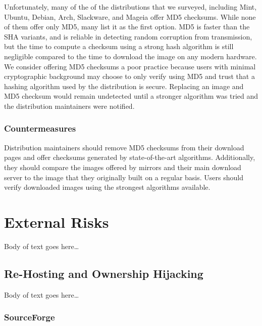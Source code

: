 \documentclass[conference]{IEEEtran}
\begin{document}
\indent Unfortunately, many of the of the distributions that we surveyed, including Mint, Ubuntu, Debian, Arch, Slackware, and Mageia offer MD5 checksums. While none of them offer only MD5, many list it as the first option. MD5 is faster than the SHA variants, and is reliable in detecting random corruption from transmission, but the time to compute a checksum using a strong hash algorithm is still negligible compared to the time to download the image on any modern hardware. We consider offering MD5 checksums a poor practice because users with minimal cryptographic background may choose to only verify using MD5 and trust that a hashing algorithm used by the distribution is secure. Replacing an image and MD5 checksum would remain undetected until a stronger algorithm was tried and the distribution maintainers were notified.\\
\subsubsection{Countermeasures}
Distribution maintainers should remove MD5 checksums from their download pages and offer checksums generated by state-of-the-art algorithms. Additionally, they should compare the images offered by mirrors and their main download server to the image that they originally built on a regular basis. Users should verify downloaded images using the strongest algorithms available.
\section{External Risks}

Body of text goes here\ldots

\subsection{Re-Hosting and Ownership Hijacking}

Body of text goes here\ldots

\subsubsection{SourceForge}
\end{document}
